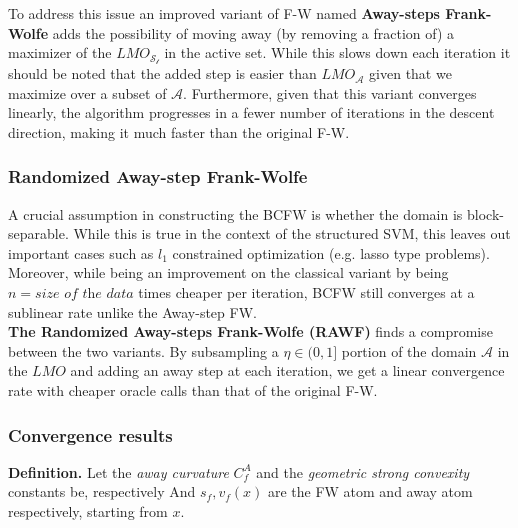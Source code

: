 To address this issue an improved variant of F-W named \textbf{Away-steps
Frank-Wolfe} adds the possibility of moving away (by removing a fraction of) a
maximizer of the $LMO_{\mathcal{S_{t}}}$ in the active set. While this slows
down each iteration it should be noted that the added step is easier than
$LMO_{\mathcal{A}}$ given that we maximize over a subset of $\mathcal{A}$.
Furthermore, given that this variant converges linearly, the algorithm
progresses in a fewer number of iterations in the descent direction, making it
much faster than the original F-W.




\subsubsection*{Randomized Away-step Frank-Wolfe}
A crucial assumption in constructing the BCFW is whether the domain is
block-separable. While this is true in the context of the structured SVM, this
leaves out important cases such as $l_{1}$ constrained optimization (e.g. lasso
type problems). \\
Moreover, while being an improvement on the classical variant by being
$n=\textit{size of the data}$ times cheaper per iteration, BCFW still converges
at a sublinear rate unlike the Away-step FW.\\

\textbf{The Randomized Away-steps Frank-Wolfe (RAWF)} finds a compromise between
the two variants. By subsampling a $\eta\in(0,1]$ portion of the domain
$\mathcal{A}$ in the $LMO$ and adding an away step at each iteration, we get a
linear convergence rate with cheaper oracle calls than that of the original F-W.
\subsubsection*{Convergence results}
\textbf{Definition.}
Let the \textit{away curvature} $C^{A}_{f}$ and the \textit{geometric strong convexity} constants be, respectively
And $s_{f}, v_{f}(x)$ are the FW atom and away atom respectively, starting from $x$.\\

